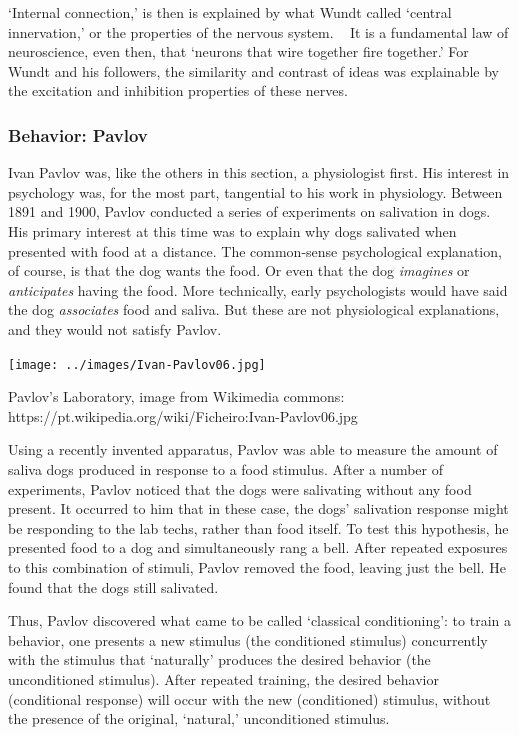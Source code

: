 \begin{refsection}
`Internal connection,' is then is explained by what Wundt called `central innervation,' or the properties of the nervous system. ~\citep{Wundt:1876vu} It is a fundamental law of neuroscience, even then, that `neurons that wire together fire together.' For Wundt and his followers, the similarity and contrast of ideas was explainable by the excitation and inhibition properties of these nerves.

\subsubsection{Behavior: Pavlov}
\label{behavior:pavlov}

Ivan Pavlov was, like the others in this section, a physiologist first. His interest in psychology was, for the most part, tangential to his work in physiology. Between 1891 and 1900, Pavlov conducted a series of experiments on salivation in dogs. His primary interest at this time was to explain why dogs salivated when presented with food at a distance. The common-sense psychological explanation, of course, is that the dog wants the food. Or even that the dog \emph{imagines} or \emph{anticipates} having the food. More technically, early psychologists would have said the dog \emph{associates} food and saliva. But these are not physiological explanations, and they would not satisfy Pavlov.\begin{marginfigure}
 \begin{center}

     \texttt{[image: ../images/Ivan-Pavlov06.jpg]}
\end{center}
 \caption{Pavlov’s Laboratory, image from Wikimedia commons: https://pt.wikipedia.org/wiki/Ficheiro:Ivan-Pavlov06.jpg }
\label{fig: pavlov1}
\end{marginfigure}


Using a recently invented apparatus, Pavlov was able to measure the amount of saliva dogs produced in response to a food stimulus. After a number of experiments, Pavlov noticed that the dogs were salivating without any food present. It occurred to him that in these case, the dogs' salivation response might be responding to the lab techs, rather than food itself. To test this hypothesis, he presented food to a dog and simultaneously rang a bell. After repeated exposures to this combination of stimuli, Pavlov removed the food, leaving just the bell. He found that the dogs still salivated.

Thus, Pavlov discovered what came to be called `classical conditioning': to train a behavior, one presents a new stimulus (the conditioned stimulus) concurrently with the stimulus that `naturally' produces the desired behavior (the unconditioned stimulus). After repeated training, the desired behavior (conditional response) will occur with the new (conditioned) stimulus, without the presence of the original, `natural,' unconditioned stimulus.


\end{refsection}
